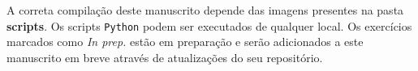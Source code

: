 
A correta compilação deste manuscrito depende das imagens presentes na pasta \textbf{scripts}. Os scripts \texttt{Python} podem ser executados de qualquer local. Os exercícios marcados como \textit{In prep.} estão em preparação e serão adicionados a este manuscrito em breve através de atualizações do seu repositório. 



